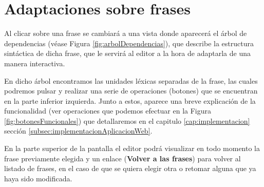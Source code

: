 \section{Adaptaciones sobre frases}

Al clicar  sobre una frase se cambiará a una vista donde aparecerá el árbol de dependencias (véase Figura \ref{fig:arbolDependencias}), que describe la estructura sintáctica de dicha frase, que le servirá al editor a la hora de adaptarla de una manera interactiva. 

En dicho árbol encontramos las unidades léxicas separadas de la frase, las cuales podremos pulsar y realizar una serie de operaciones (botones) que se encuentran en la parte inferior izquierda. Junto a estos, aparece una breve explicación de la funcionalidad (ver operaciones que podemos efectuar en la Figura \ref{fig:botonesFuncionales}) que detallaremos en el capitulo \ref{cap:implementacion} sección \ref{subsec:implementacionAplicacionWeb}. 

En la parte superior de la pantalla el editor podrá visualizar en todo momento la frase previamente elegida y un enlace (\textbf{Volver a las frases}) para volver al listado de frases, en el caso de que se quiera elegir otra o retomar alguna que ya haya sido modificada.

